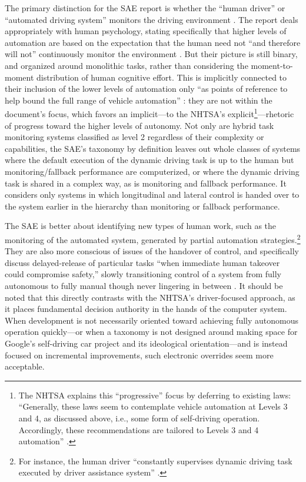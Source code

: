 The primary distinction for the SAE report is whether the ``human driver'' or ``automated
driving system'' monitors the driving environment \cite[p. 5]{SAE}. The report deals
appropriately with human psychology, stating specifically that higher
levels of automation are based on the expectation that the human need
not ``and therefore will not'' continuously
monitor the environment \cite[p. 9]{SAE}. But their 
picture is still binary, and organized around monolithic tasks, rather
than considering the moment-to-moment 
distribution of human 
cognitive effort. This is implicitly connected to their inclusion of
the lower levels of automation only ``as points of reference to help
bound the full range of vehicle automation'' \cite[p. 2]{SAE}: they are not within
the document's focus, which favors an implicit---to the NHTSA's
explicit\footnote{The NHTSA explains this ``progressive'' focus by deferring to existing
  laws: ``Generally, these laws seem to contemplate vehicle 
automation at Levels 3 and 4, as discussed above, i.e., some form of
self-driving operation. 
Accordingly, these recommendations are tailored to Levels 3 and 4
automation'' \cite[p. 10]{NHTSA}.}---rhetoric of progress toward the
higher levels of autonomy. 
Not only are hybrid task monitoring systems classified as level 2
regardless of their complexity or capabilities, the SAE's taxonomy by
definition leaves out whole classes of systems where the default
execution of the dynamic driving task is up to the human but
monitoring/fallback performance are computerized, or where the dynamic
driving task is shared in a complex way, as is monitoring and fallback
performance. It considers only systems in which longitudinal and
lateral control is handed over to the system earlier in the hierarchy
than monitoring or fallback performance.

The SAE is better about
identifying new types of human work, such as the monitoring of the
automated system, generated by partial automation
strategies.\footnote{For instance, the human driver ``constantly
  supervises dynamic driving task executed by driver assistance
  system'' \cite[p. 3]{SAE}.} They
are also more conscious of issues of the handover of control, and
specifically discuss delayed-release of particular tasks ``when
immediate human takeover could compromise safety,'' slowly
transitioning control of a system from fully autonomous to fully
manual though never lingering in between \cite[p. 4]{SAE}. It should be
noted that this directly contrasts with the NHTSA's driver-focused
approach, as it places fundamental decision authority in the hands of
the computer system. When development is not necessarily oriented
toward achieving fully autonomous operation quickly---or when a
taxonomy is not designed around making space for Google's self-driving
car project and its ideological orientation---and is instead
focused on incremental improvements, such electronic overrides seem more acceptable.

